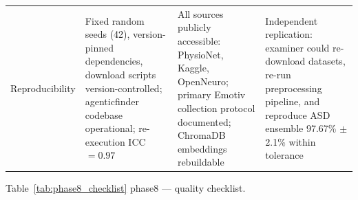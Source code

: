 \begin{xltabular}{\textwidth}{@{} >{\raggedright\arraybackslash}p{0.14\textwidth} X X X @{}}
\addlinespace
Reproducibility       & Fixed random seeds (42), version-pinned dependencies, download scripts version-controlled; agenticfinder codebase operational; re-execution ICC $= 0.97$ & All sources publicly accessible: PhysioNet, Kaggle, OpenNeuro; primary Emotiv collection protocol documented; ChromaDB embeddings rebuildable & Independent replication: examiner could re-download datasets, re-run preprocessing pipeline, and reproduce ASD ensemble 97.67\% $\pm$ 2.1\% within tolerance \\
\end{xltabular}
\endgroup

\vspace{1.5em}

\begingroup\singlespacing\tablefontsize\tablestripes
\noindent Table~\ref{tab:phase8_checklist} phase8 --- quality checklist.

